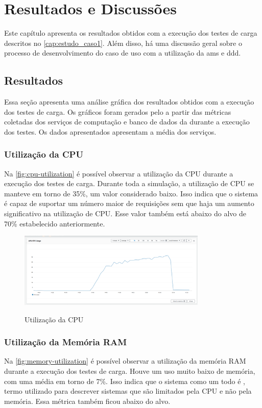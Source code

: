 \chapter{Resultados e Discussões}
\label{cap:resultados}
Este capítulo apresenta os resultados obtidos com a execução dos testes de carga descritos no \autoref{cap:estudo_caso1}. Além disso, há uma discussão geral sobre o processo de desenvolvimento do caso de uso com a utilização da \acrfull{ams} e \acrfull{ddd}.

\section{Resultados}
Essa seção apresenta uma análise gráfica dos resultados obtidos com a execução dos testes de carga. Os gráficos foram gerados pelo  a partir das métricas coletadas dos serviços de computação e banco de dados da  durante a execução dos testes. Os dados apresentados apresentam a média dos serviços.

\subsection{Utilização da CPU}
Na \autoref{fig:cpu-utilization} é possível observar a utilização da CPU durante a execução dos testes de carga. Durante toda a simulação, a utilização de CPU se manteve em torno de 35\%, um valor considerado baixo. Isso indica que o sistema é capaz de suportar um número maior de requisições sem que haja um aumento significativo na utilização de CPU. Esse valor também está abaixo do alvo de 70\% estabelecido anteriormente. 

\begin{figure}[H]
    \centering
    \caption{Utilização da CPU}
    \includegraphics[width=0.8\textwidth]{media/cpu-usage.png}
    \label{fig:cpu-utilization}
\end{figure}

\subsection{Utilização da Memória RAM}
Na \autoref{fig:memory-utilization} é possível observar a utilização da memória RAM durante a execução dos testes de carga. Houve um uso muito baixo de memória, com uma média em torno de 7\%. Isso indica que o sistema como um todo é , termo utilizado para descrever sistemas que são limitados pela CPU e não pela memória. Essa métrica também ficou abaixo do alvo.


